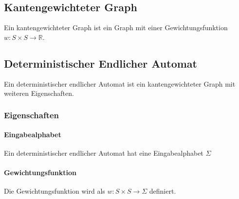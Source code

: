 \documentclass[../main.tex]{subfiles}
\begin{document}
        \subsection{Kantengewichteter Graph}
            Ein kantengewichteter Graph ist ein Graph mit einer Gewichtungsfunktion $w\colon S \times S \rightarrow \mathbb{R}$.
            
            \begin{center}
            \end{center}
            
        \subsection[DEA]{Deterministischer Endlicher Automat}
            Ein deterministischer endlicher Automat ist ein kantengewichteter Graph mit weiteren Eigenschaften.
            
            \subsubsection{Eigenschaften}
                \paragraph{Eingabealphabet}
                    Ein deterministischer endlicher Automat hat eine Eingabealphabet $\Sigma$
                
                \paragraph{Gewichtungsfunktion}
                    Die Gewichtungsfunktion wird als $w\colon S \times S \rightarrow \Sigma$ definiert.
                    
\end{document}
